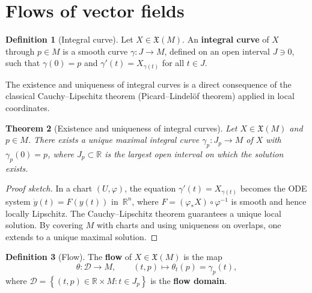 \documentclass[12pt,a4paper,openany]{book}
\newtheorem{theorem}{Theorem}[section]
\theoremstyle{definition}
\newtheorem{definition}[theorem]{Definition}
\theoremstyle{remark}
\newcommand{\R}{\mathbb{R}}
\newcommand{\set}[1]{\left\{ #1 \right\}}
\begin{document}
\section{Flows of vector fields}\label{sec:flows}

\begin{definition}[Integral curve]\label{def:integral-curve}%
Let $X \in \mathfrak{X}(M)$.  An \textbf{integral curve} of $X$ through
$p \in M$ is a smooth curve $\gamma \colon J \to M$, defined on an open
interval $J \ni 0$, such that $\gamma(0) = p$ and
$\gamma'(t) = X_{\gamma(t)}$ for all $t \in J$.
\end{definition}

The existence and uniqueness of integral curves is a direct consequence
of the classical Cauchy--Lipschitz theorem
(Picard--Lindel\"of theorem) applied in local coordinates.

\begin{theorem}[Existence and uniqueness of integral curves]%
\label{thm:integral-curve}
Let $X \in \mathfrak{X}(M)$ and $p \in M$.  There exists a unique
maximal integral curve $\gamma_p \colon J_p \to M$ of $X$ with
$\gamma_p(0) = p$, where $J_p \subset \R$ is the largest open interval
on which the solution exists.
\end{theorem}

\begin{proof}[Proof sketch]
In a chart $(U, \varphi)$, the equation $\gamma'(t) = X_{\gamma(t)}$
becomes the ODE system $\dot{y}(t) = F(y(t))$ in~$\R^n$, where
$F = (\varphi_* X) \circ \varphi^{-1}$ is smooth and hence locally
Lipschitz.  The Cauchy--Lipschitz theorem guarantees a unique local
solution.  By covering $M$ with charts and using uniqueness on overlaps,
one extends to a unique maximal solution.
\end{proof}

\begin{definition}[Flow]\label{def:flow}%
The \textbf{flow} of $X \in \mathfrak{X}(M)$ is the map
\[
  \theta \colon \mathcal{D} \to M,
  \qquad (t, p) \mapsto \theta_t(p) = \gamma_p(t),
\]
where $\mathcal{D} = \set{(t, p) \in \R \times M : t \in J_p}$ is the
\textbf{flow domain}.
\end{definition}
\end{document}
